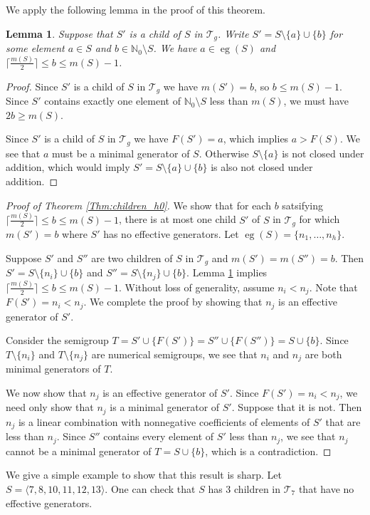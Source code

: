 \documentclass[12pt]{amsart}
\DeclareMathOperator{\eg}{eg}
\newcommand{\N}{{\mathbb N}}
\newcommand{\T}{{\mathcal T}}
\theoremstyle{plain}\newtheorem{proposition}{Proposition}[section]
\newtheorem{lemma}[proposition]{Lemma}
\begin{document}
We apply the following lemma in the proof of this theorem.
\begin{lemma}\label{ineffectiveGaps}
Suppose that $S'$ is a child of $S$ in $\T_g$.  Write $S' = S \setminus \{a\} \cup \{b\}$ for some element $a \in S$ and $b \in \N_0 \setminus S$.  
We have $a \in \eg(S)$ and  $\lceil \frac{m(S)}{2}\rceil \le b \le m(S)-1$.
\end{lemma}

\begin{proof}
Since $S'$ is a child of $S$ in $\T_g$ we have $m(S') = b$, so $b \le m(S) - 1$.  Since $S'$ contains exactly one element of $\N_0 \setminus S$ less than $m(S)$, we must have $2b \ge m(S)$.  

Since $S'$ is a child of $S$ in $\T_g$ we have $F(S') = a$, which implies $a > F(S)$.  We see that $a$ must be a minimal generator of $S$. Otherwise $S\setminus \{a\}$ is not closed under addition, which would imply $S' = S\setminus \{a\} \cup\{b\}$ is also not closed under addition.
\end{proof}


\begin{proof}[Proof of Theorem \ref{Thm:children_h0}]
We show that for each $b$ satsifying $\lceil \frac{m(S)}{2}\rceil \le b \le m(S)-1$, there is at most one child $S'$ of $S$ in $\T_g$ for which $m(S') = b$ where $S'$ has no effective generators.  Let $\eg(S) = \{n_1, \ldots, n_h\}$.

Suppose $S'$ and $S''$ are two children of $S$ in $\T_g$ and $m(S') = m(S'') = b$.  Then $S' = S \setminus \{n_i\} \cup \{b\}$ and $S'' = S \setminus \{n_j\} \cup \{b\}$.  Lemma \ref{ineffectiveGaps} implies $\lceil \frac{m(S)}{2}\rceil \le b \le m(S)-1$.  Without loss of generality, assume $n_i < n_j$.  Note that $F(S') = n_i < n_j$.  We complete the proof by showing that $n_j$ is an effective generator of $S'$.

Consider the semigroup $T = S' \cup \{F(S')\} = S'' \cup\{F(S'')\} = S \cup \{b\}$.  Since $T \setminus \{n_i\}$ and $T \setminus \{n_j\}$ are numerical semigroups, we see that $n_i$ and $n_j$ are both minimal generators of $T$.

We now show that $n_j$ is an effective generator of $S'$.  Since $F(S') = n_i < n_j$, we need only show that $n_j$ is a minimal generator of $S'$.  Suppose that it is not.  Then $n_j$ is a linear combination with nonnegative coefficients of elements of $S'$ that are less than $n_j$.  Since $S''$ contains every element of $S'$ less than $n_j$, we see that $n_j$ cannot be a minimal generator of $T = S \cup\{b\}$, which is a contradiction.
\end{proof}
We give a simple example to show that this result is sharp.  Let $S = \langle 7,8,10,11,12,13\rangle$.  One can check that $S$ has $3$ children in $\T_7$ that have no effective generators.
\end{document}
